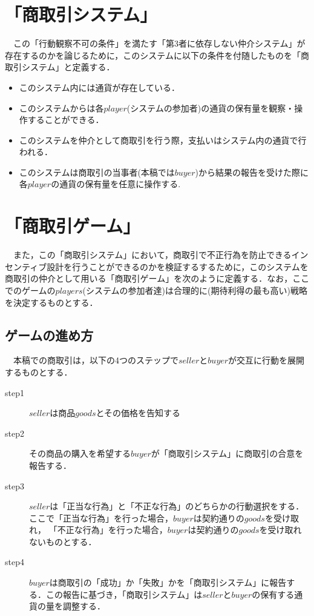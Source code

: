 \documentclass[twocolumn, a4j]{article}
\begin{document}
\section{「商取引システム」}
　この「行動観察不可の条件」を満たす「第3者に依存しない仲介システム」が存在するのかを論じるために，このシステムに以下の条件を付随したものを「商取引システム」と定義する．
\begin{itemize}
  \item このシステム内には通貨が存在している．
  \item このシステムからは各$player$(システムの参加者)の通貨の保有量を観察・操作することができる．
  \item このシステムを仲介として商取引を行う際，支払いはシステム内の通貨で行われる．
  \item このシステムは商取引の当事者(本稿では$buyer$)から結果の報告を受けた際に各$player$の通貨の保有量を任意に操作する.
\end{itemize}

\section{「商取引ゲーム」}
　また，この「商取引システム」において，商取引で不正行為を防止できるインセンティブ設計を行うことができるのかを検証するするために，このシステムを商取引の仲介として用いる「商取引ゲーム」を次のように定義する．なお，ここでのゲームの$players$(システムの参加者達)は合理的に(期待利得の最も高い)戦略を決定するものとする．

\subsection{ゲームの進め方}
　本稿での商取引は，以下の4つのステップで$seller$と$buyer$が交互に行動を展開するものとする．

\begin{description}
  \item[step1] $seller$は商品$goods$とその価格を告知する
  \item[step2]  その商品の購入を希望する$buyer$が「商取引システム」に商取引の合意を報告する．
  \item[step3]  $seller$は「正当な行為」と「不正な行為」のどちらかの行動選択をする．ここで「正当な行為」を行った場合，$buyer$は契約通りの$goods$を受け取れ， 「不正な行為」を行った場合，$buyer$は契約通りの$goods$を受け取れないものとする．
  \item[step4]  $buyer$は商取引の「成功」か「失敗」かを「商取引システム」に報告する．この報告に基づき，「商取引システム」は$ seller$と$ buyer$の保有する通貨の量を調整する．
\end{description}
\end{document}
